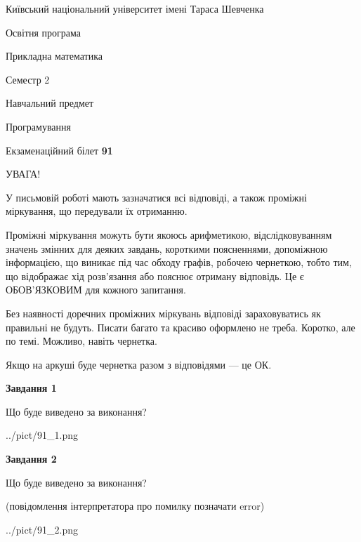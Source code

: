 \documentclass[12pt, ukrainian]{article}
\begin{document}
{{\begin {small}\par
{ \center  Київський національний університет імені Тараса Шевченка \par}
{\parbox {5 cm}{Освітня програма \hfill}{\parbox {7 cm}{Прикладна математика\hfill}}\parbox {6 cm}{\hfill Семестр 2}}\par
{\parbox {5 cm} {Навчальний предмет \hfill}\parbox {7 cm}{Програмування \hfill}\parbox {6cm}{\hfill}\par}\vspace{-7pt} \end{small}}{\center Екзаменаційний білет \No \textbf
{ 91 }\par}}
{
\begin {large}
УВАГА!

У письмовій роботі мають зазначатися всі відповіді, а також проміжні міркування, що передували їх отриманню.

Проміжні міркування можуть бути якоюсь арифметикою, відслідковуванням зна\-чень змінних для деяких завдань,
короткими поясненнями, допоміжною інформацією, що виникає під час обходу графів, робочею чернеткою,
тобто тим, що відображає хід розв’язання або пояснює отриману відповідь.
Це є ОБОВ’ЯЗКОВИМ для кожного запитання.

Без наявності доречних проміжних міркувань відповіді зараховуватись як правиль\-ні не будуть.
Писати багато та красиво оформлено не треба. Коротко, але по темі. Можли\-во, навіть чернетка.

Якщо на аркуші буде чернетка разом з відповідями --- це ОК.

\newpage

{\begin {center}\textbf{Завдання 1}\end {center}}\par
Що буде виведено за виконання?\par
\begin{center}
	{../pict/91_1.png}
\end{center}
\newpage

{\begin {center}\textbf{Завдання 2}\end {center}}\par
Що буде виведено за виконання?\par
 (повідомлення інтерпретатора про помилку позначати error)\par
\begin{center}
	{../pict/91_2.png}
\end{center}
\newpage


\end{large}}
\end{document}
